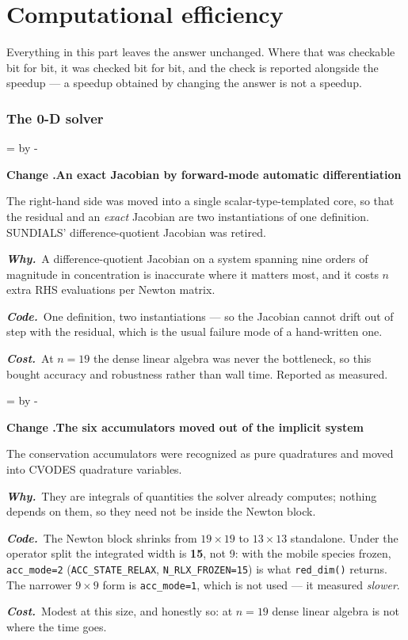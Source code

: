 \documentclass[11pt,a4paper]{article}
\newcommand{\code}[1]{\texttt{\small #1}}
\newcommand{\needlines}[1]{%
  \par\dimen0=\pagegoal \advance\dimen0 by -\pagetotal
  \ifdim\dimen0<#1\baselineskip \newpage \fi}
\newcounter{chg}
\newcommand{\change}[1]{%
  \needlines{4}%
  \refstepcounter{chg}%
  \par\medskip\noindent
  {\bfseries\boldmath Change \thechg.\quad #1}%
  \par\nobreak\smallskip}
\newcommand{\why}[1]{\par\noindent\textbf{\itshape Why.}\ #1\par}
\newcommand{\impact}[1]{\par\noindent\textbf{\itshape Code.}\ #1\par}
\newcommand{\cost}[1]{\par\noindent\textbf{\itshape Cost.}\ #1\par}
\begin{document}
\part{Computational efficiency}
\label{part:performance}

Everything in this part leaves the answer unchanged. Where that was checkable
bit for bit, it was checked bit for bit, and the check is reported alongside
the speedup --- a speedup obtained by changing the answer is not a speedup.

\section{The 0-D solver}

\change{An exact Jacobian by forward-mode automatic differentiation}
\label{chg:ad}
The right-hand side was moved into a single scalar-type-templated core, so that
the residual and an \emph{exact} Jacobian are two instantiations of one
definition. SUNDIALS' difference-quotient Jacobian was retired.
\why{A difference-quotient Jacobian on a system spanning nine orders of
magnitude in concentration is inaccurate where it matters most, and it costs
$n$ extra RHS evaluations per Newton matrix.}
\impact{One definition, two instantiations --- so the Jacobian cannot drift out
of step with the residual, which is the usual failure mode of a hand-written
one.}
\cost{At $n = 19$ the dense linear algebra was never the bottleneck, so this
bought accuracy and robustness rather than wall time. Reported as measured.}

\change{The six accumulators moved out of the implicit system}
\label{chg:quadrature}
The conservation accumulators were recognized as pure quadratures and moved
into CVODES quadrature variables.
\why{They are integrals of quantities the solver already computes; nothing
depends on them, so they need not be inside the Newton block.}
\impact{The Newton block shrinks from $19\times19$ to $13\times13$ standalone.
Under the operator split the integrated width is \textbf{15}, not 9: with the
mobile species frozen, \code{acc\_mode=2} (\code{ACC\_STATE\_RELAX},
\code{N\_RLX\_FROZEN=15}) is what \code{red\_dim()} returns. The narrower
$9\times9$ form is \code{acc\_mode=1}, which is not used --- it measured
\emph{slower}.}
\cost{Modest at this size, and honestly so: at $n = 19$ dense linear algebra is
not where the time goes.}
\end{document}
